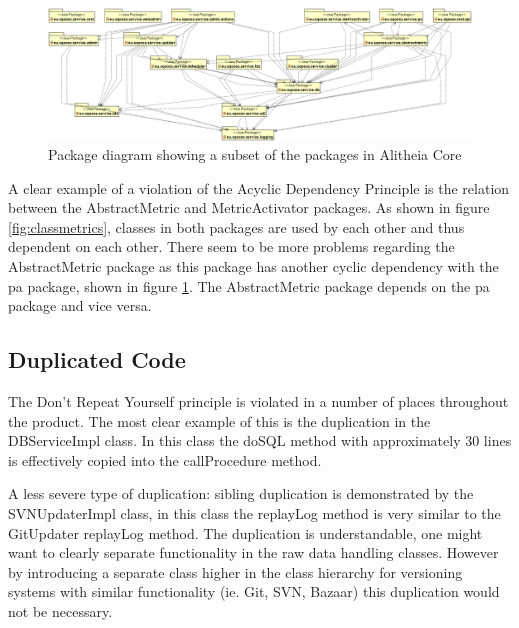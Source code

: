 \documentclass[a4paper,11pt,titlepage]{article}
\begin{document}
\begin{figure}
\includegraphics[scale=0.25]{package_diagram_core_no_impl_no_core}
\centering
\caption{Package diagram showing a subset of the packages in Alitheia Core}
\label{fig:package}
\end{figure}

A clear example of a violation of the Acyclic Dependency Principle is the relation between the AbstractMetric and MetricActivator packages. As shown in figure \ref{fig:classmetrics}, classes in both packages are used by each other and thus dependent on each other. There seem to be more problems regarding the AbstractMetric package as this package has another cyclic dependency with the pa package, shown in figure \ref{fig:package}. The AbstractMetric package depends on the pa package and vice versa.

\subsection{Duplicated Code}
The Don't Repeat Yourself principle is violated in a number of places throughout the product. The most clear example of this is the duplication in the DBServiceImpl class. In this class the doSQL method with approximately 30 lines is effectively copied into the callProcedure method.

A less severe type of duplication: sibling duplication is demonstrated by the SVNUpdaterImpl class, in this class the replayLog method is very similar to the GitUpdater replayLog method. The duplication is understandable, one might want to clearly separate functionality in the raw data handling classes. However by introducing a separate class higher in the class hierarchy for versioning systems with similar functionality (ie. Git, SVN, Bazaar) this duplication would not be necessary.
\end{document}
